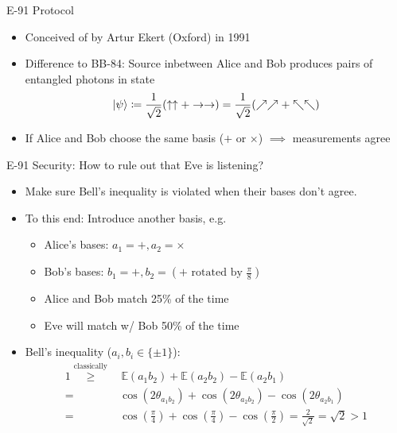 \documentclass{beamer}
\begin{document}
	\begin{frame}{E-91 Protocol} %
		\begin{itemize}
			\item Conceived of by Artur Ekert (Oxford) in 1991
			\item Difference to BB-84: Source inbetween Alice and Bob
			produces pairs of entangled photons in state
				\begin{align*}
					\ket{\psi} \coloneqq \frac{1}{\sqrt{2}}(\uparrow \uparrow + \rightarrow
					\rightarrow) = \frac{1}{\sqrt{2}}(\nearrow \nearrow +
					\nwarrow \nwarrow)
				\end{align*}
			\item If Alice and Bob choose the same basis ($+$ or $\times$) $\implies$
			measurements agree
		\end{itemize}
	\end{frame}

	\begin{frame}{E-91 Security: How to rule out that Eve is listening?}
		\begin{itemize}
			\item Make sure Bell's inequality is violated when their
			bases don't agree.
			\item<2-> To this end: Introduce another basis, e.g.
				\begin{itemize}
					\item Alice's bases: $a_1 = +, a_2 = \times$
					\item Bob's bases: $b_1 = +, b_2 = (+ \text{ rotated by } \frac{\pi}{8})$
					\item Alice and Bob match 25\% of the time
					\item Eve will match w/ Bob 50\% of the time
				\end{itemize}
			\item<3-> Bell's inequality ($a_i, b_i \in \{\pm 1\}$):
				\begin{align*}
					1 \overset{\text{classically}}{\geq}&\, \mathbb{E}(a_1 b_2) + \mathbb{E}(a_2 b_2) - \mathbb{E}(a_2 b_1) \\
					=& \cos(2 \theta_{a_1 b_2}) + \cos(2 \theta_{a_2 b_2}) - \cos(2 \theta_{a_2 b_1}) \\
					=& \cos(\frac{\pi}{4}) + \cos(\frac{\pi}{4}) - \cos(\frac{\pi}{2})
					= \frac{2}{\sqrt{2}} = \sqrt{2} > 1
				\end{align*}
		\end{itemize}
	\end{frame}
\end{document}
